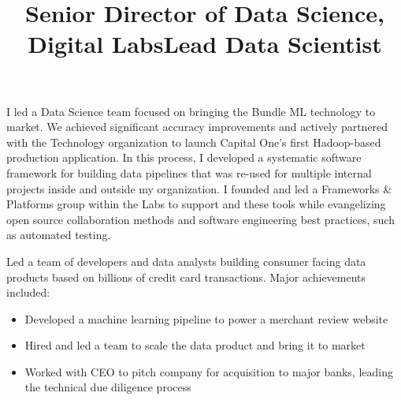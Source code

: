 \begin{resume}
\title{Senior Director of Data Science, Digital Labs}
\begin{position}
I led a Data Science team focused on bringing the Bundle ML technology
to market.  We achieved significant accuracy improvements and actively partnered
with the Technology organization to launch Capital One's first Hadoop-based
production application. In this process, I developed a systematic software
framework for building data pipelines that was re-used for multiple
internal projects inside and outside my organization.  I founded and led a
Frameworks \& Platforms group within the Labs to support and these tools while
evangelizing open source collaboration methods and software engineering best practices,
such as automated testing.

\end{position}


\title{Lead Data Scientist}
\begin{position}
Led a team of developers and data analysts building consumer facing data products based on billions of credit card transactions.
Major achievements included:
\begin{itemize}
  \item Developed a machine learning pipeline to power a merchant review website
  \item Hired and led a team to scale the data product and bring it to market
  \item Worked with CEO to pitch company for acquisition to major banks, leading the technical due diligence process
\end{itemize}
\end{position}


\end{resume}
